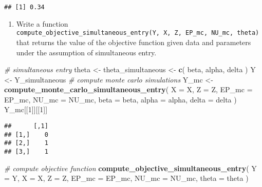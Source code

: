 \documentclass[
]{book}
\newenvironment{Shaded}{\begin{snugshade}}{\end{snugshade}}
\newcommand{\AttributeTok}[1]{\textcolor[rgb]{0.13,0.29,0.53}{#1}}
\newcommand{\CommentTok}[1]{\textcolor[rgb]{0.56,0.35,0.01}{\textit{#1}}}
\newcommand{\DecValTok}[1]{\textcolor[rgb]{0.00,0.00,0.81}{#1}}
\newcommand{\FunctionTok}[1]{\textcolor[rgb]{0.13,0.29,0.53}{\textbf{#1}}}
\newcommand{\NormalTok}[1]{#1}
\newcommand{\OtherTok}[1]{\textcolor[rgb]{0.56,0.35,0.01}{#1}}
\providecommand{\tightlist}{%
  \setlength{\itemsep}{0pt}\setlength{\parskip}{0pt}}
\begin{document}
\begin{verbatim}
## [1] 0.34
\end{verbatim}

\begin{enumerate}
\def\labelenumi{\arabic{enumi}.}
\setcounter{enumi}{2}
\tightlist
\item
  Write a function \texttt{compute\_objective\_simultaneous\_entry(Y,\ X,\ Z,\ EP\_mc,\ NU\_mc,\ theta)} that returns the value of the objective function given data and parameters under the assumption of simultaneous entry.
\end{enumerate}

\begin{Shaded}
\begin{Highlighting}[]
\CommentTok{\# simultaneous entry}
\NormalTok{theta }\OtherTok{\textless{}{-}} 
\NormalTok{  theta\_simultaneous }\OtherTok{\textless{}{-}}
  \FunctionTok{c}\NormalTok{(}
\NormalTok{    beta, }
\NormalTok{    alpha, }
\NormalTok{    delta}
\NormalTok{    )}
\NormalTok{Y }\OtherTok{\textless{}{-}}\NormalTok{ Y\_simultaneous}
\CommentTok{\# compute monte carlo simulations}
\NormalTok{Y\_mc }\OtherTok{\textless{}{-}} 
  \FunctionTok{compute\_monte\_carlo\_simultaneous\_entry}\NormalTok{(}
  \AttributeTok{X =}\NormalTok{ X, }
  \AttributeTok{Z =}\NormalTok{ Z, }
  \AttributeTok{EP\_mc =}\NormalTok{ EP\_mc, }
  \AttributeTok{NU\_mc =}\NormalTok{ NU\_mc, }
  \AttributeTok{beta =}\NormalTok{ beta, }
  \AttributeTok{alpha =}\NormalTok{ alpha, }
  \AttributeTok{delta =}\NormalTok{ delta}
\NormalTok{  )}
\NormalTok{Y\_mc[[}\DecValTok{1}\NormalTok{]][[}\DecValTok{1}\NormalTok{]]}
\end{Highlighting}
\end{Shaded}

\begin{verbatim}
##      [,1]
## [1,]    0
## [2,]    1
## [3,]    1
\end{verbatim}

\begin{Shaded}
\begin{Highlighting}[]
\CommentTok{\# compute objective function}
\FunctionTok{compute\_objective\_simultaneous\_entry}\NormalTok{(}
  \AttributeTok{Y =}\NormalTok{ Y, }
  \AttributeTok{X =}\NormalTok{ X, }
  \AttributeTok{Z =}\NormalTok{ Z, }
  \AttributeTok{EP\_mc =}\NormalTok{ EP\_mc, }
  \AttributeTok{NU\_mc =}\NormalTok{ NU\_mc, }
  \AttributeTok{theta =}\NormalTok{ theta}
\NormalTok{  )}
\end{Highlighting}
\end{Shaded}
\end{document}
